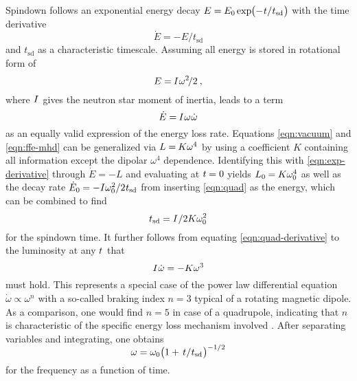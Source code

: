 Spindown follows an exponential energy decay $E = \kern-0.3pt E_0 \kern-0.2pt \exp \kern-2.0pt
\smash{\bigl( - \kern+0.5pt t \kern+0.1pt / \kern+0.2pt t_\text{sd} \kern+0.5pt \bigr)}$ with the time derivative
\begin{equation}
	\dot{E} = - E / t_\text{sd}
	\label{eqn:exp-derivative}
\end{equation}
and $t_\text{sd}$ as a characteristic timescale. Assuming all energy is stored in rotational form of
\begin{equation}
	E = \kern-0.5pt I \kern+0.5pt \omega^2 \kern-1.5pt / 2 \: ,
	\label{eqn:quad}
\end{equation}
where $I \kern+0.5pt$ gives the neutron star moment of inertia, leads to a term
\begin{equation}
	\dot{E} = \kern-0.5pt I \kern+0.5pt \omega \kern+0.5pt \dot{\omega}
	\label{eqn:quad-derivative}
\end{equation}
as an equally valid expression of the energy loss rate. Equations \eqref{eqn:vacuum} and \eqref{eqn:ffe-mhd} can be generalized via
$L = \kern-0.5pt K \omega^4$ by using a coefficient $K$ containing all information except the dipolar $\omega^4$ dependence.
Identifying this with \eqref{eqn:exp-derivative} through $\dot{E} = -L$ and evaluating at $t \kern-0.3pt= 0$ yields
$L_0 \kern-0.3pt = \kern-0.2pt K \omega_0^4$ as well as the decay rate $\dot{E}_0 \kern-0.3pt = -I \omega_0^2 / 2 \kern+0.4pt t_\text{sd}$
from inserting \eqref{eqn:quad} as the energy, which can be combined to find
\begin{equation}
	t_\text{sd} = I \kern+0.5pt / 2K\omega_0^2
	\label{eqn:spindown-time}
\end{equation}
for the spindown time. It further follows from equating \eqref{eqn:quad-derivative} to the luminosity at any $t \kern+0.5pt$ that
\begin{equation}
	I \kern+0.5pt \dot{\omega} = -K \omega^3
\end{equation}
must hold. This represents a special case of the power law differential equation $\dot{\omega} \propto \omega^n$ with a so-called
braking index $n = 3$ typical of a rotating magnetic dipole. As a comparison, one would find $n = 5$ in case of a quadrupole, indicating
that $n$ is characteristic of the specific energy loss mechanism involved \cite{Alvarez_2004}. After separating variables and integrating,
one obtains
\begin{equation}
	\omega = \omega_0 \smash{\bigl( 1 + \kern+1.5pt t \kern+0.1pt / \kern+0.2pt t_\text{sd} \kern+0.5pt \bigr)^{-1/2}}
	\label{eqn:frequency}
\end{equation}
for the frequency as a function of time.

